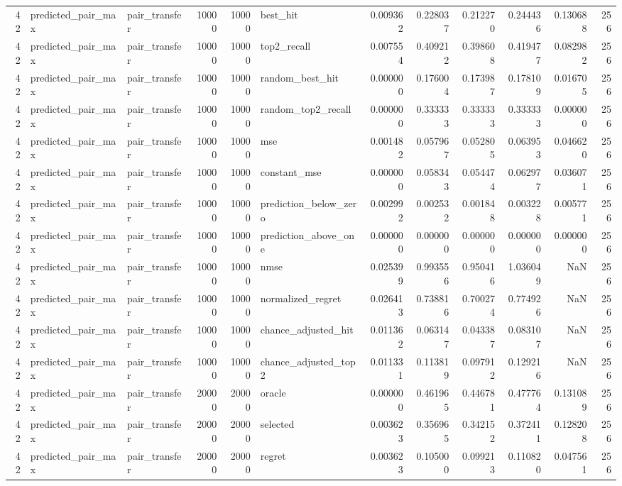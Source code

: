 \begin{tabular}{rllrrlrrrrrr}
42 & predicted_pair_max & pair_transfer & 10000 & 10000 & best_hit & 0.009362 & 0.228037 & 0.212270 & 0.244436 & 0.130688 & 256 \\
42 & predicted_pair_max & pair_transfer & 10000 & 10000 & top2_recall & 0.007554 & 0.409212 & 0.398608 & 0.419477 & 0.082982 & 256 \\
42 & predicted_pair_max & pair_transfer & 10000 & 10000 & random_best_hit & 0.000000 & 0.176004 & 0.173987 & 0.178109 & 0.016705 & 256 \\
42 & predicted_pair_max & pair_transfer & 10000 & 10000 & random_top2_recall & 0.000000 & 0.333333 & 0.333333 & 0.333333 & 0.000000 & 256 \\
42 & predicted_pair_max & pair_transfer & 10000 & 10000 & mse & 0.001482 & 0.057967 & 0.052805 & 0.063953 & 0.046620 & 256 \\
42 & predicted_pair_max & pair_transfer & 10000 & 10000 & constant_mse & 0.000000 & 0.058343 & 0.054474 & 0.062977 & 0.036071 & 256 \\
42 & predicted_pair_max & pair_transfer & 10000 & 10000 & prediction_below_zero & 0.002992 & 0.002532 & 0.001848 & 0.003228 & 0.005771 & 256 \\
42 & predicted_pair_max & pair_transfer & 10000 & 10000 & prediction_above_one & 0.000000 & 0.000000 & 0.000000 & 0.000000 & 0.000000 & 256 \\
42 & predicted_pair_max & pair_transfer & 10000 & 10000 & nmse & 0.025399 & 0.993556 & 0.950416 & 1.036049 & NaN & 256 \\
42 & predicted_pair_max & pair_transfer & 10000 & 10000 & normalized_regret & 0.026413 & 0.738816 & 0.700274 & 0.774926 & NaN & 256 \\
42 & predicted_pair_max & pair_transfer & 10000 & 10000 & chance_adjusted_hit & 0.011362 & 0.063147 & 0.043387 & 0.083107 & NaN & 256 \\
42 & predicted_pair_max & pair_transfer & 10000 & 10000 & chance_adjusted_top2 & 0.011331 & 0.113819 & 0.097912 & 0.129216 & NaN & 256 \\
42 & predicted_pair_max & pair_transfer & 20000 & 20000 & oracle & 0.000000 & 0.461965 & 0.446781 & 0.477764 & 0.131089 & 256 \\
42 & predicted_pair_max & pair_transfer & 20000 & 20000 & selected & 0.003623 & 0.356965 & 0.342152 & 0.372411 & 0.128208 & 256 \\
42 & predicted_pair_max & pair_transfer & 20000 & 20000 & regret & 0.003623 & 0.105000 & 0.099213 & 0.110820 & 0.047561 & 256 \\

\end{tabular}
